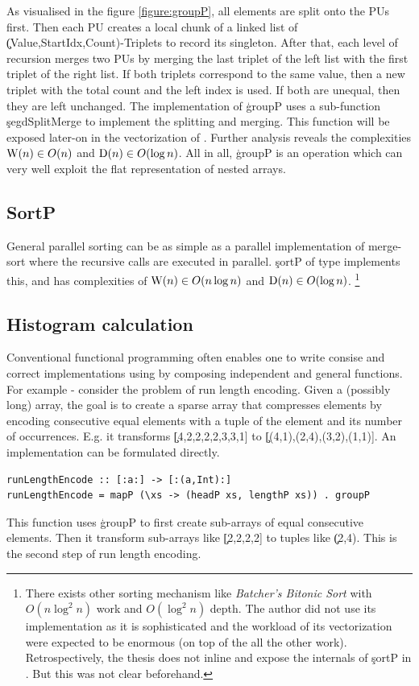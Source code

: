     As visualised in the figure \ref{figure:groupP},
    all elements are split onto the PUs first.
    Then each PU creates a local chunk of a linked list of
    \c{(Value,StartIdx,Count)}-Triplets to record its singleton.
    After that, each level of recursion merges two PUs by
    merging the last triplet of the left list with the first triplet
    of the right list. If both triplets correspond to the same value,
    then a new triplet with the total count and the left index is used.
    If both are unequal, then they are left unchanged. The implementation
    of \c{groupP} uses a sub-function \c{segdSplitMerge} to implement the
    splitting and merging. This function will be exposed later-on in
    the vectorization of \ndpn.
    Further analysis reveals the complexities $\textrm{W}(n) \in O(n)$ and $\textrm{D}(n) \in O(\log n)$.
    All in all, \c{groupP} is an operation which can very well exploit the flat representation of nested arrays.
    
  \subsection*{SortP}
    General parallel sorting can be as simple as a parallel
    implementation of merge-sort where the recursive calls are executed
    in parallel. \c{sortP} of type \type{[:Int:] -> [:Int:]} implements this,
    and has complexities of $\textrm{W}(n) \in O(n \log n)$
    and $\textrm{D}(n) \in O(\log n)$.
    \footnote{There exists other sorting mechanism
    like \emph{Batcher's Bitonic Sort} with $O(n \log^2 n)$ work and $O(\log^2 n)$
    depth. The author did not use its implementation as it is sophisticated and
    the workload of its vectorization were expected to be enormous (on top of the all the other work).
    Retrospectively, the thesis does not inline and expose the internals of \c{sortP} in \ndpv.
    But this was not clear beforehand.
    }

  \subsection*{Histogram calculation}
    Conventional functional programming often enables one to write
    consise and correct implementations using by composing
    independent and general functions. For example -
    consider the problem of run length encoding. Given a (possibly long) array,
    the goal is to create a sparse array that compresses elements
    by encoding consecutive equal elements
    with a tuple of the element and its number of occurrences.
    E.g. it transforms \c{[4,2,2,2,2,3,3,1]} to \c{[(4,1),(2,4),(3,2),(1,1)]}.
    An implementation can be formulated directly.
    \begin{lstlisting}
runLengthEncode :: [:a:] -> [:(a,Int):]
runLengthEncode = mapP (\xs -> (headP xs, lengthP xs)) . groupP
    \end{lstlisting}
    This function uses \c{groupP} to first create sub-arrays of
    equal consecutive elements. Then it
    transform sub-arrays like \c{[2,2,2,2]} to tuples like \c{(2,4)}.
    This is the second step of run length encoding.
    
